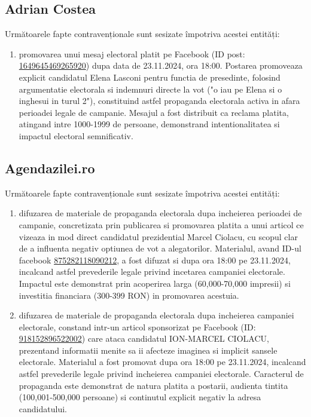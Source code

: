 \documentclass[a4paper,12pt]{article}
\begin{document}
\subsection{Adrian Costea}
Următoarele fapte contravenționale sunt sesizate împotriva acestei entități:

\begin{enumerate}[leftmargin=*, label=\arabic*.)]
    \item promovarea unui mesaj electoral platit pe Facebook (ID post: \href{https://www.facebook.com/ads/library/?id=1649645469265920}{1649645469265920}) dupa data de 23.11.2024, ora 18:00. Postarea promoveaza explicit candidatul Elena Lasconi pentru functia de presedinte, folosind argumentatie electorala si indemnuri directe la vot ("o iau pe Elena si o inghesui in turul 2"), constituind astfel propaganda electorala activa in afara perioadei legale de campanie. Mesajul a fost distribuit ca reclama platita, atingand intre 1000-1999 de persoane, demonstrand intentionalitatea si impactul electoral semnificativ.
\end{enumerate}

\vspace{0.5cm}

\subsection{Agendazilei.ro}
Următoarele fapte contravenționale sunt sesizate împotriva acestei entități:

\begin{enumerate}[leftmargin=*, label=\arabic*.)]
    \item difuzarea de materiale de propaganda electorala dupa incheierea perioadei de campanie, concretizata prin publicarea si promovarea platita a unui articol ce vizeaza in mod direct candidatul prezidential Marcel Ciolacu, cu scopul clar de a influenta negativ optiunea de vot a alegatorilor. Materialul, avand ID-ul facebook \href{https://www.facebook.com/ads/library/?id=875282118090212}{875282118090212}, a fost difuzat si dupa ora 18:00 pe 23.11.2024, incalcand astfel prevederile legale privind incetarea campaniei electorale. Impactul este demonstrat prin acoperirea larga (60,000-70,000 impresii) si investitia financiara (300-399 RON) in promovarea acestuia.
    \item difuzarea de materiale de propaganda electorala dupa incheierea campaniei electorale, constand intr-un articol sponsorizat pe Facebook (ID: \href{https://www.facebook.com/ads/library/?id=918152896522002}{918152896522002}) care ataca candidatul ION-MARCEL CIOLACU, prezentand informatii menite sa ii afecteze imaginea si implicit sansele electorale. Materialul a fost promovat dupa ora 18:00 pe 23.11.2024, incalcand astfel prevederile legale privind incheierea campaniei electorale. Caracterul de propaganda este demonstrat de natura platita a postarii, audienta tintita (100,001-500,000 persoane) si continutul explicit negativ la adresa candidatului.
\end{enumerate}
\end{document}
